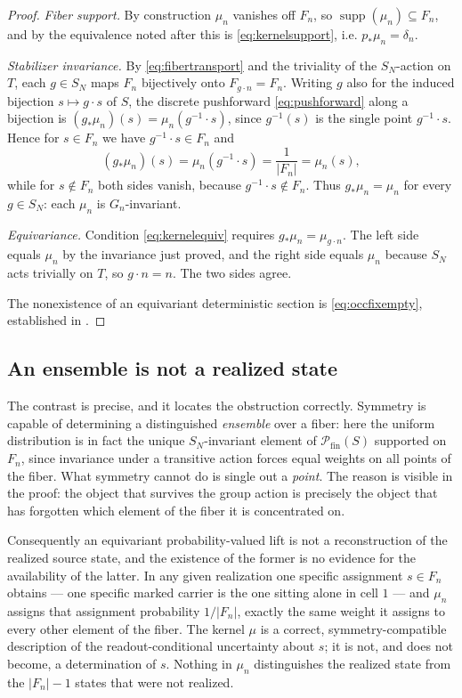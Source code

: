 \documentclass[11pt,reqno]{amsart}
\theoremstyle{plain}
\theoremstyle{definition}
\theoremstyle{remark}
\begin{document}
\begin{proof}
\emph{Fiber support.} By construction $\mu_{n}$ vanishes off $F_{n}$, so $\operatorname{supp}(\mu_{n})\subseteq F_{n}$, and by the equivalence noted after  this is \eqref{eq:kernelsupport}, i.e. $p_{\ast}\mu_{n}=\delta_{n}$.

\emph{Stabilizer invariance.} By \eqref{eq:fibertransport} and the triviality of the $S_{N}$-action on $T$, each $g\in S_{N}$ maps $F_{n}$ bijectively onto $F_{g\cdot n}=F_{n}$. Writing $g$ also for the induced bijection $s\mapsto g\cdot s$ of $S$, the discrete pushforward \eqref{eq:pushforward} along a bijection is $(g_{\ast}\mu_{n})(s)=\mu_{n}(g^{-1}\cdot s)$, since $g^{-1}(s)$ is the single point $g^{-1}\cdot s$. Hence for $s\in F_{n}$ we have $g^{-1}\cdot s\in F_{n}$ and
\[
(g_{\ast}\mu_{n})(s)=\mu_{n}(g^{-1}\cdot s)=\frac{1}{|F_{n}|}=\mu_{n}(s),
\]
while for $s\notin F_{n}$ both sides vanish, because $g^{-1}\cdot s\notin F_{n}$. Thus $g_{\ast}\mu_{n}=\mu_{n}$ for every $g\in S_{N}$: each $\mu_{n}$ is $G_{n}$-invariant.

\emph{Equivariance.} Condition \eqref{eq:kernelequiv} requires $g_{\ast}\mu_{n}=\mu_{g\cdot n}$. The left side equals $\mu_{n}$ by the invariance just proved, and the right side equals $\mu_{n}$ because $S_{N}$ acts trivially on $T$, so $g\cdot n=n$. The two sides agree.

The nonexistence of an equivariant deterministic section is \eqref{eq:occfixempty}, established in .
\end{proof}

\subsection{An ensemble is not a realized state}

The contrast is precise, and it locates the obstruction correctly. Symmetry is capable of determining a distinguished \emph{ensemble} over a fiber: here the uniform distribution is in fact the unique $S_{N}$-invariant element of $\mathcal{P}_{\mathrm{fin}}(S)$ supported on $F_{n}$, since invariance under a transitive action forces equal weights on all points of the fiber. What symmetry cannot do is single out a \emph{point}. The reason is visible in the proof: the object that survives the group action is precisely the object that has forgotten which element of the fiber it is concentrated on.

Consequently an equivariant probability-valued lift is not a reconstruction of the realized source state, and the existence of the former is no evidence for the availability of the latter. In any given realization one specific assignment $s\in F_{n}$ obtains --- one specific marked carrier is the one sitting alone in cell $1$ --- and $\mu_{n}$ assigns that assignment probability $1/|F_{n}|$, exactly the same weight it assigns to every other element of the fiber. The kernel $\mu$ is a correct, symmetry-compatible description of the readout-conditional uncertainty about $s$; it is not, and does not become, a determination of $s$. Nothing in $\mu_{n}$ distinguishes the realized state from the $|F_{n}|-1$ states that were not realized.
\end{document}
